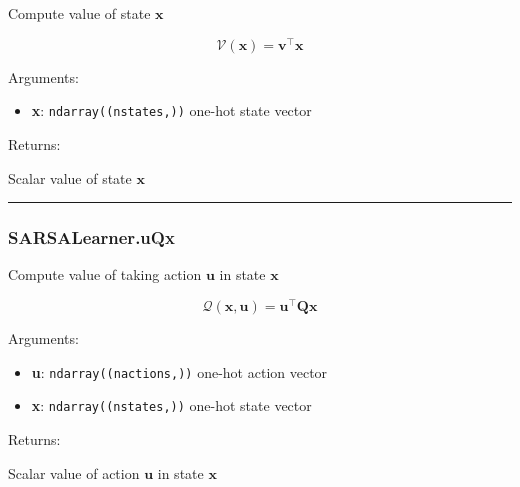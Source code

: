 \begin{Shaded}
\begin{Highlighting}[]
\end{Highlighting}
\end{Shaded}

Compute value of state \(\mathbf x\)

\[
\mathcal V(\mathbf x) = \mathbf v^\top \mathbf x
\]

Arguments:

\begin{itemize}
\tightlist
\item
  \textbf{x}: \texttt{ndarray((nstates,))} one-hot state vector
\end{itemize}

Returns:

Scalar value of state \(\mathbf x\)

\begin{center}\rule{0.5\linewidth}{\linethickness}\end{center}

\hypertarget{sarsalearner.uqx}{%
\subsubsection{SARSALearner.uQx}\label{sarsalearner.uqx}}

\begin{Shaded}
\begin{Highlighting}[]
\end{Highlighting}
\end{Shaded}

Compute value of taking action \(\mathbf u\) in state \(\mathbf x\)

\[
\mathcal Q(\mathbf x, \mathbf u) = \mathbf u^\top \mathbf Q \mathbf x
\]

Arguments:

\begin{itemize}
\tightlist
\item
  \textbf{u}: \texttt{ndarray((nactions,))} one-hot action vector
\item
  \textbf{x}: \texttt{ndarray((nstates,))} one-hot state vector
\end{itemize}

Returns:

Scalar value of action \(\mathbf u\) in state \(\mathbf x\)


